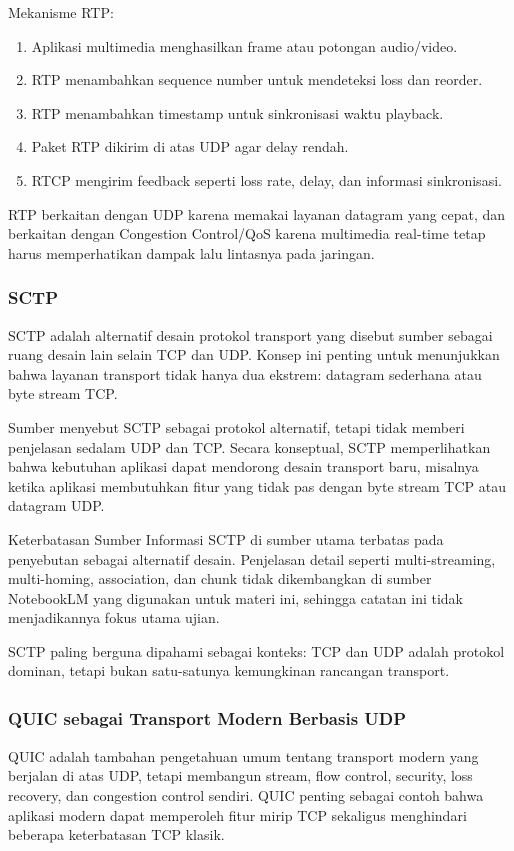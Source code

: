 Mekanisme RTP:
\begin{enumerate}
    \item Aplikasi multimedia menghasilkan frame atau potongan audio/video.
    \item RTP menambahkan sequence number untuk mendeteksi loss dan reorder.
    \item RTP menambahkan timestamp untuk sinkronisasi waktu playback.
    \item Paket RTP dikirim di atas UDP agar delay rendah.
    \item RTCP mengirim feedback seperti loss rate, delay, dan informasi sinkronisasi.
\end{enumerate}

RTP berkaitan dengan UDP karena memakai layanan datagram yang cepat, dan berkaitan dengan Congestion Control/QoS karena multimedia real-time tetap harus memperhatikan dampak lalu lintasnya pada jaringan.

\subsubsection{SCTP}
\begin{jawab}
SCTP adalah alternatif desain protokol transport yang disebut sumber sebagai ruang desain lain selain TCP dan UDP. Konsep ini penting untuk menunjukkan bahwa layanan transport tidak hanya dua ekstrem: datagram sederhana atau byte stream TCP.
\end{jawab}

Sumber menyebut SCTP sebagai protokol alternatif, tetapi tidak memberi penjelasan sedalam UDP dan TCP. Secara konseptual, SCTP memperlihatkan bahwa kebutuhan aplikasi dapat mendorong desain transport baru, misalnya ketika aplikasi membutuhkan fitur yang tidak pas dengan byte stream TCP atau datagram UDP.

\begin{cmt}{Keterbatasan Sumber}{}
Informasi SCTP di sumber utama terbatas pada penyebutan sebagai alternatif desain. Penjelasan detail seperti multi-streaming, multi-homing, association, dan chunk tidak dikembangkan di sumber NotebookLM yang digunakan untuk materi ini, sehingga catatan ini tidak menjadikannya fokus utama ujian.
\end{cmt}

SCTP paling berguna dipahami sebagai konteks: TCP dan UDP adalah protokol dominan, tetapi bukan satu-satunya kemungkinan rancangan transport.

\subsubsection{QUIC sebagai Transport Modern Berbasis UDP\texorpdfstring{\textsuperscript{\dag}}{}}
\begin{jawab}
QUIC adalah tambahan pengetahuan umum tentang transport modern yang berjalan di atas UDP, tetapi membangun stream, flow control, security, loss recovery, dan congestion control sendiri. QUIC penting sebagai contoh bahwa aplikasi modern dapat memperoleh fitur mirip TCP sekaligus menghindari beberapa keterbatasan TCP klasik.
\end{jawab}


